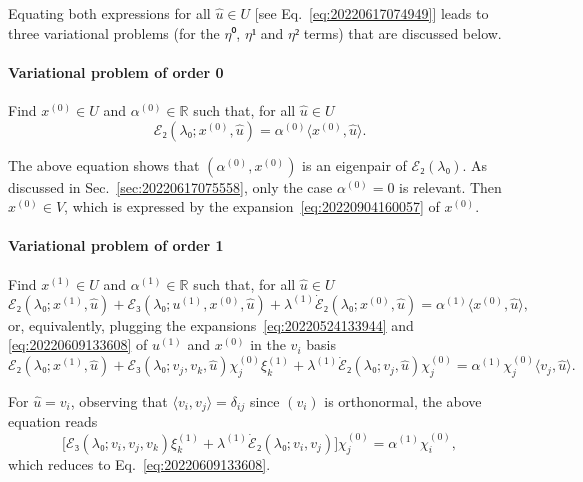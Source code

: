 \documentclass[12pt, final]{scrartcl}
\theoremstyle{definition}
\newcommand{\E}{\mathcal E}
\newcommand{\order}[2][1]{#2^{(#1)}}
\newcommand{\reals}{\mathbb{R}}
\begin{document}
Equating both expressions for all $\hat{u} \in U$ [see
Eq.~\eqref{eq:20220617074949}] leads to three variational problems (for the
$η⁰$, $η¹$ and $η²$ terms) that are discussed below.

\paragraph{Variational problem of order 0} Find $\order[0]x \in U$ and $\order[0]α\in\reals$ such
that, for all $\hat{u} \in U$
\begin{equation*}
  \E₂(\lambda₀; \order[0]x, \hat{u}) = \order[0]α 〈 \order[0]x, \hat{u} 〉.
\end{equation*}

The above equation shows that $(\order[0]α, \order[0]x)$ is an eigenpair of $\E₂(\lambda₀)$. As
discussed in Sec.~\ref{sec:20220617075558}, only the case $\order[0]α = 0$ is
relevant. Then $\order[0]x \in V$, which is expressed by the
expansion~\eqref{eq:20220904160057} of $\order[0]x$.

\paragraph{Variational problem of order 1} Find $\order[1]x \in U$ and $\order[1]α\in\reals$ such
that, for all $\hat{u} \in U$
\begin{equation}
  \label{eq:20220609131953}
  \E₂(\lambda₀; \order[1]x, \hat{u}) + \E₃(\lambda₀; \order[1]u, \order[0]x, \hat{u}) + \order[1]\lambda \dot{\E}₂(\lambda₀; \order[0]x, \hat{u})
  = \order[1]α 〈 \order[0]x, \hat{u} 〉,
\end{equation}
or, equivalently, plugging the expansions~\eqref{eq:20220524133944} and
\eqref{eq:20220609133608} of $\order[1]u$ and $\order[0]x$ in the $v_i$ basis
\begin{equation}
  \label{eq:20220617080547}
  \E₂(\lambda₀; \order[1]x, \hat{u}) + \E₃(\lambda₀; v_j, v_k, \hat{u}) \order[0]{χ_j} \order[1]{ξ_k} + \order[1]\lambda \dot{\E}₂(\lambda₀; v_j, \hat{u}) \order[0]{χ_j}
  = \order[1]α \order[0]{χ_j} 〈 v_j, \hat{u} 〉.
\end{equation}

For $\hat{u} = v_i$, observing that $〈 v_i, v_j 〉 = δ_{ij}$ since
$(v_i)$ is orthonormal, the above equation reads
\begin{equation}
  \bigl[\E₃(\lambda₀; v_i, v_j, v_k) \order[1]{ξ_k} + \order[1]\lambda \dot{\E}₂(\lambda₀; v_i, v_j)\bigr] \order[0]{χ_j} = \order[1]α \order[0]{χ_i},
\end{equation}
which reduces to Eq.~\eqref{eq:20220609133608}.
\end{document}
